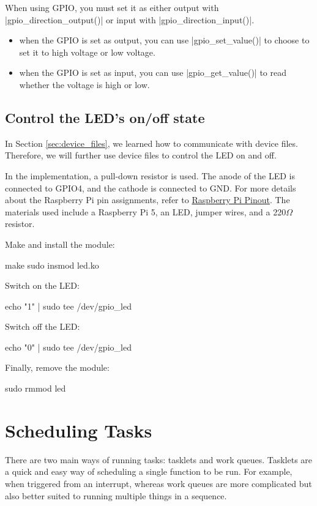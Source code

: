 \documentclass[10pt, oneside]{book}
\begin{document}
When using GPIO, you must set it as either output with \cpp|gpio_direction_output()| or input with \cpp|gpio_direction_input()|.

\begin{itemize}
  \item when the GPIO is set as output, you can use \cpp|gpio_set_value()| to choose to set it to high voltage or low voltage.
  \item when the GPIO is set as input, you can use \cpp|gpio_get_value()| to read whether the voltage is high or low.
\end{itemize}

\subsection{Control the LED's on/off state}
\label{sec:gpio_led}
In Section \ref{sec:device_files}, we learned how to communicate with device files.
Therefore, we will further use device files to control the LED on and off.

In the implementation, a pull-down resistor is used.
The anode of the LED is connected to GPIO4, and the cathode is connected to GND.
For more details about the Raspberry Pi pin assignments, refer to \href{https://pinout.xyz/}{Raspberry Pi Pinout}.
The materials used include a Raspberry Pi 5, an LED, jumper wires, and a 220$\Omega$ resistor.


Make and install the module:
\begin{codebash}
make
sudo insmod led.ko
\end{codebash}

Switch on the LED:
\begin{codebash}
echo "1" | sudo tee /dev/gpio_led
\end{codebash}

Switch off the LED:
\begin{codebash}
echo "0" | sudo tee /dev/gpio_led
\end{codebash}

Finally, remove the module:
\begin{codebash}
sudo rmmod led
\end{codebash}

\section{Scheduling Tasks}
\label{sec:scheduling_tasks}
There are two main ways of running tasks: tasklets and work queues.
Tasklets are a quick and easy way of scheduling a single function to be run.
For example, when triggered from an interrupt, whereas work queues are more complicated but also better suited to running multiple things in a sequence.
\end{document}
